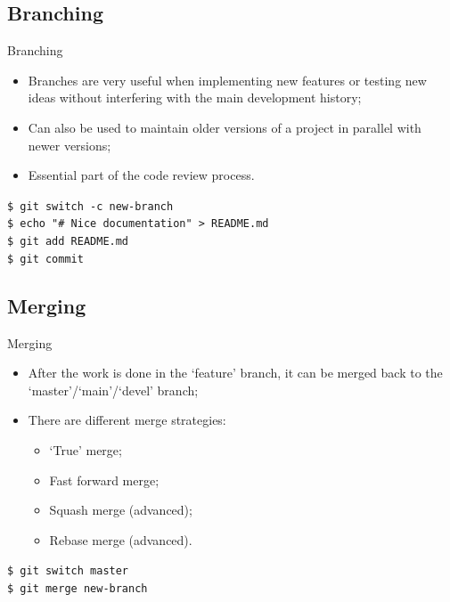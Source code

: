 \documentclass{beamer}
\begin{document}
\subsection{Branching}
\begin{frame}{Branching}
  \begin{itemize}
    \item Branches are very useful when implementing new features or testing new ideas without interfering with the main development history;
    \item Can also be used to maintain older versions of a project in parallel with newer versions;
    \item Essential part of the code review process.
  \end{itemize}
  \begin{block}{}
    \texttt{\$ git switch -c new-branch} \\
    \texttt{\$ echo "\# Nice documentation" > README.md} \\
    \texttt{\$ git add README.md} \\
    \texttt{\$ git commit}
  \end{block}
\end{frame}

\subsection{Merging}
\begin{frame}{Merging}
  \begin{itemize}
    \item After the work is done in the `feature' branch, it can be merged back to the `master'/`main'/`devel' branch;
    \item There are different merge strategies:
    \begin{itemize}
      \item `True' merge;
      \item Fast forward merge;
      \item Squash merge (advanced);
      \item Rebase merge (advanced).
    \end{itemize}
  \end{itemize}
  \begin{block}{}
    \texttt{\$ git switch master} \\
    \texttt{\$ git merge new-branch}
  \end{block}
\end{frame}
\end{document}
